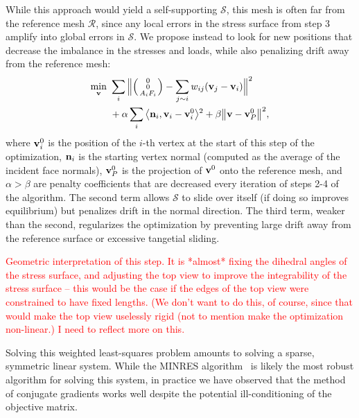 \documentclass[annual]{acmsiggraph}
\makeatletter
\def\<{\mathchoice{\big\langle}{\langle}{\langle}{\langle}}
\def\>{\mathchoice{\big\rangle}{\rangle}{\rangle}{\rangle}}
\def\Forcevector{\Big(\mbox{\scriptsize
	\def\arraystretch{0.8}\begin{tabular}{@{\,}c@{\,}}
	0 \\ 0 \\ $A_i F_i$
	\end{tabular}}\Big)}
\def\SS{{\mathcal S}}
\def\RR{{\mathcal R}}
\newcommand{\todo}[1]{\textcolor{red}{#1}}
\makeatother
\begin{document}
While this approach would yield a self-supporting $\SS$, this mesh is
often far from the reference mesh $\RR$, since any local errors in the
stress surface from step 3 amplify into global errors in $\SS$. We propose
instead to look for new positions that decrease the imbalance in the
stresses and loads, while also penalizing drift away from the reference
mesh:
	\begin{align*}
	\min_{\vw}
	\ &
	\sum_i \Big\|
		\Forcevector -
		\sum_{j\sim i} w_{ij} (\vw_j - \vw_i)
		\Big\|^2
	\\ &
	+ \alpha \sum_i
		\<\nw_i, \vw_i - \vw^0_i \>^2
		+ \beta \big\|\vw - \vw^0_P\big\|^2,
\end{align*}
 where ${\mathbf v}^0_i$ is the position of the $i$-th vertex at the start of this
step of the optimization, ${\mathbf n}_i$ is the starting vertex normal (computed
as the average of the incident face normals), ${\mathbf v}^0_P$ is the projection
of ${\mathbf v}^0$ onto the reference mesh, and $\alpha > \beta$ are penalty
coefficients that are decreased every iteration of steps 2-4 of the
algorithm. The second term allows $\SS$ to slide over itself (if doing so
improves equilibrium) but penalizes drift in the normal direction. The
third term, weaker than the second, regularizes the optimization by
preventing large drift away from the reference surface or excessive
tangetial sliding.

\todo{Geometric interpretation of this step. It is *almost* fixing the
dihedral angles of the stress surface, and adjusting the top view to
improve the integrability of the stress surface -- this would be the case
if the edges of the top view were constrained to have fixed lengths. (We
don't want to do this, of course, since that would make the top view
uselessly rigid (not to mention make the optimization non-linear.) I need
to reflect more on this.}

Solving this weighted least-squares problem amounts to solving a sparse,
symmetric linear system. While the MINRES algorithm~\cite{paige75} is likely
the most robust algorithm for solving this system, in practice we have
observed that the method of conjugate gradients works well despite the
potential ill-conditioning of the objective matrix.
\end{document}
